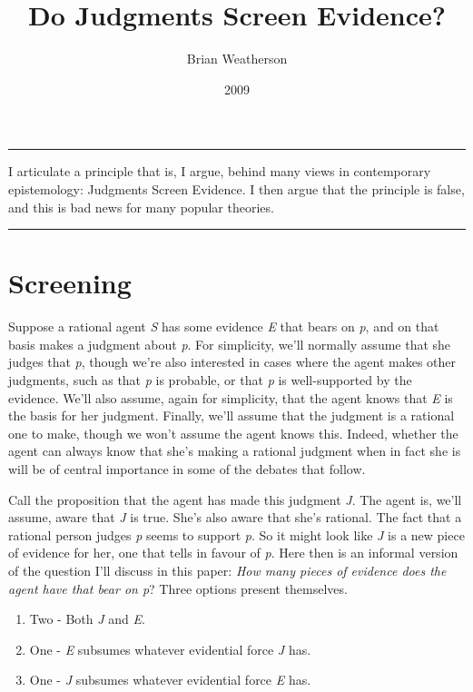 \documentclass[
  10pt,
  letterpaper,
  DIV=11,
  numbers=noendperiod,
  twoside]{scrartcl}
\title{Do Judgments Screen Evidence?}
\author{Brian Weatherson}
\date{2009}
\providecommand{\tightlist}{%
  \setlength{\itemsep}{0pt}\setlength{\parskip}{0pt}}\usepackage{longtable,booktabs,array}
\renewenvironment{abstract}
 {\vspace{-1.25cm}
 \quotation\small\noindent\rule{\linewidth}{.5pt}\par\smallskip
 \noindent }
 {\par\noindent\rule{\linewidth}{.5pt}\endquotation}
\begin{document}
\maketitle
\begin{abstract}
I articulate a principle that is, I argue, behind many views in
contemporary epistemology: Judgments Screen Evidence. I then argue that
the principle is false, and this is bad news for many popular theories.
\end{abstract}


\section{Screening}\label{screening}

Suppose a rational agent \emph{S} has some evidence \emph{E} that bears
on \emph{p}, and on that basis makes a judgment about \emph{p}. For
simplicity, we'll normally assume that she judges that \emph{p}, though
we're also interested in cases where the agent makes other judgments,
such as that \emph{p} is probable, or that \emph{p} is well-supported by
the evidence. We'll also assume, again for simplicity, that the agent
knows that \emph{E} is the basis for her judgment. Finally, we'll assume
that the judgment is a rational one to make, though we won't assume the
agent knows this. Indeed, whether the agent can always know that she's
making a rational judgment when in fact she is will be of central
importance in some of the debates that follow.

Call the proposition that the agent has made this judgment \emph{J}. The
agent is, we'll assume, aware that \emph{J} is true. She's also aware
that she's rational. The fact that a rational person judges \emph{p}
seems to support \emph{p}. So it might look like \emph{J} is a new piece
of evidence for her, one that tells in favour of \emph{p}. Here then is
an informal version of the question I'll discuss in this paper:
\emph{How many pieces of evidence does the agent have that bear on p}?
Three options present themselves.

\begin{enumerate}
\def\labelenumi{\arabic{enumi}.}
\tightlist
\item
  Two - Both \emph{J} and \emph{E}.
\item
  One - \emph{E} subsumes whatever evidential force \emph{J} has.
\item
  One - \emph{J} subsumes whatever evidential force \emph{E} has.
\end{enumerate}
\end{document}
